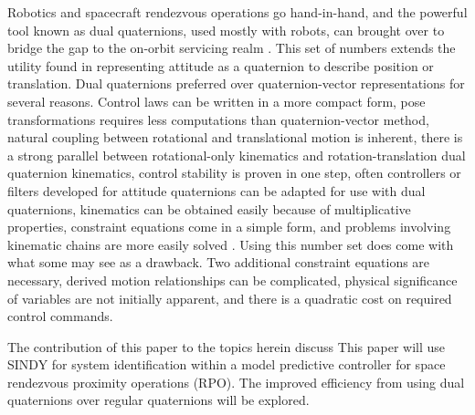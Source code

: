 \documentclass[letterpaper, preprint, paper,11pt]{AAS}	%
\begin{document}
Robotics and spacecraft rendezvous operations go hand-in-hand, and the powerful tool known as dual quaternions, used mostly with robots, can brought over to bridge the gap to the on-orbit servicing realm \cite{valverde_tsiotras_spacecraftrobot}. This set of numbers extends the utility found in representing attitude as a quaternion to describe position or translation. Dual quaternions preferred over quaternion-vector representations for several reasons. Control laws can be written in a more compact form, pose transformations requires less computations than quaternion-vector method, natural coupling between rotational and translational motion is inherent, there is a strong parallel between rotational-only kinematics and rotation-translation dual quaternion kinematics, control stability is proven in one step, often controllers or filters developed for attitude quaternions can be adapted for use with dual quaternions, kinematics can be obtained easily because of multiplicative properties, constraint equations come in a simple form, and problems involving kinematic chains are more easily solved \cite{filipe_tsiotras_dualQ,tsiotras_valverde_DualQuatAsTool,dooley_mccarthy_spatialrigidbody}. Using this number set does come with what some may see as a drawback. Two additional constraint equations are necessary, derived motion relationships can be complicated, physical significance of variables are not initially apparent, and there is a quadratic cost on required control commands. \cite{dooley_mccarthy_spatialrigidbody,lee_mesbahi,constrainedautonomousprecision}


The contribution of this paper to the topics herein discuss
This paper will use SINDY for system identification within a model predictive controller for space rendezvous proximity operations (RPO). The improved efficiency from using dual quaternions over regular quaternions will be explored. 




\end{document}
